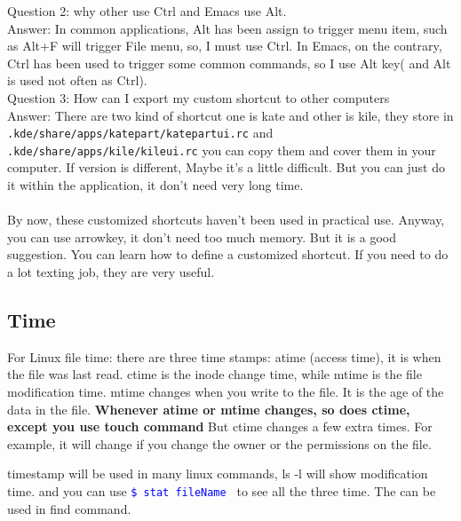 \documentclass[paper=8.5in:11in, twoside, 12pt, pagesize=pdftex]{book}
\newcommand{\linuxcommand}[1]{\texttt{\textcolor{blue}{\$ #1 \Pisymbol{psy}{191}}}}
\begin{document}
	Question 2: why other use Ctrl and Emacs use Alt. \\
	Answer: In common applications, Alt has been assign to trigger menu item, such as Alt+F will trigger File menu, so, I must use Ctrl. In Emacs, on the contrary,
	Ctrl has been used to trigger some common commands, so I use Alt key( and Alt is used not often as Ctrl).\\

	Question 3: How can I export my custom shortcut to other computers \\
	Answer: There are two kind of shortcut one is kate and other is kile, they store in \verb=.kde/share/apps/katepart/katepartui.rc= and \linebreak[4] \verb=.kde/share/apps/kile/kileui.rc=
	you can copy them and cover them in your computer. If version is different, Maybe it's a little difficult. But you can just do it within the application, it don't need very long time. \\
        \\
	By now, these customized shortcuts haven't been used in practical use. Anyway, you can use arrowkey, it don't need too much memory. But it is a good suggestion. You can learn how to define a customized shortcut. If you need to do a lot texting job, they are very useful.
	 
\fi	 
	 
\subsection{Time}

	\par For Linux file time: there are three time stamps: atime (access time), it is when the file was last read.  ctime is the inode change time, while mtime is the file modification time.  mtime changes when you write to the file. It is the age of the data in the file. \textbf{Whenever atime or mtime changes, so does ctime, except you use touch command} But ctime changes a few extra times. For example, it will change if you change the owner or the permissions on the file.  

	\par timestamp will be used in many linux commands, ls -l will show modification time. and you can use \linuxcommand{stat fileName} to see all the three time. The can be used in find command. 
\end{document}
